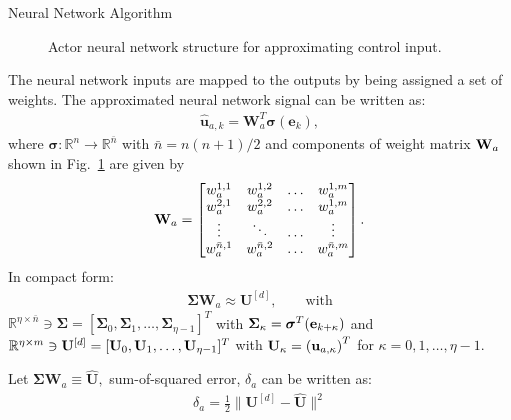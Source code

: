\documentclass[final]{beamer}
\newlength{\onecolwid}
\begin{document}
\begin{frame}[t]
\begin{columns}[t]
\begin{column}{\onecolwid}
\begin{block}{Neural Network Algorithm}
\begin{figure}
\begin{tikzpicture}[x=1.5cm, y=1.5cm]
      \end{tikzpicture}
  \caption{Actor neural network structure for approximating control input.}
  \label{fig:nnActor}
\end{figure}

\vskip 1.5cm

The neural network inputs are mapped to the outputs by being assigned a set of weights. 
The approximated neural network signal can be written as:
\begin{align}
  \label{eq:approximatePolicyActorWeights}
    \hat{\mathbf{u}}_{a,k} = \mathbf{W}_a^T\bm{\sigma}(\mathbf{e}_k),
  \end{align}
%
where $\bm{\sigma}:\mathbb{R}^n\to\mathbb{R}^{\bar{n}}$ with $\bar{n} = n(n+1)/2$ and components of weight matrix ${\bf W}_a$ shown in Fig.~\ref{fig:nnActor} are given by %
%
\begin{align*}
  {\bf W}_a = 
  \begin{bmatrix}
    w_a^{1,1} &  w_a^{1,2} & \ldots &w_a^{1,m}\\
    w_a^{2,1} & w_a^{2,2}& \ldots &w_a^{1,m}\\
    \vdots & \ddots & \ldots &\vdots\\
    w_a^{\bar{n},1} & w_a^{\bar{n},2}& \ldots &w_a^{\bar{n},m}
  \end{bmatrix}.
\end{align*}
%
In compact form:
  \begin{align*}
    \bm{\Sigma}\mathbf{W}_a \approx  \mathbf{U}^{[d]},\qquad\text{with}
  \end{align*}
  $\mathbb{R}^{\eta\times\bar{n}}\ni \bm{\Sigma} = [\bm{\Sigma}_0,\bm{\Sigma}_1,\ldots,\bm{\Sigma}_{\eta -1}]^T$ with $\bm{\Sigma}_\kappa = \bm{\sigma}^T({\bf e}_{k+\kappa})$ and $\mathbb{R}^{\eta\times m}\ni {\bf U}^{[d]} = [{\bf U}_0,{\bf U}_1,\ldots, {\bf U}_{\eta-1}]^T$ with ${\bf U}_\kappa = \left({\bf u}_{a,\kappa}\right)^T$ for $\kappa = 0,1,\ldots,\eta-1.$

  Let $\bm{\Sigma}\mathbf{W}_a\equiv \hat{\mathbf{U}},$ sum-of-squared error, $\delta_a$ can be written as:
  \begin{align*}
    \delta_a = \frac{1}{2}\|\mathbf{U}^{[d]} - \hat{\mathbf{U}}\|^2
  \end{align*}


\end{block}
\end{column}
\end{columns}
\end{frame}
\end{document}
